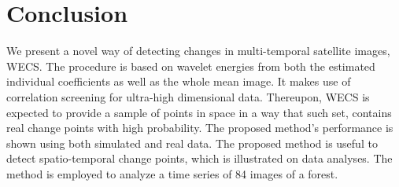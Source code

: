 \documentclass[journal]{IEEEtran}
\begin{document}
\section{Conclusion}\label{section_discussion}

We present a novel way of detecting changes in multi-temporal satellite images, WECS. The procedure is based on wavelet energies from both the estimated individual coefficients as well as the whole mean image. It makes use of correlation screening for ultra-high dimensional data. Thereupon, WECS is expected to provide a sample of points in space in a way that such set, contains real change points with high probability. The proposed method's performance is shown using both simulated and real data. The proposed method is useful to detect spatio-temporal change points, which is illustrated on data analyses. The method is employed to analyze a time series of 84 images of a forest.







%

%
\end{document}
